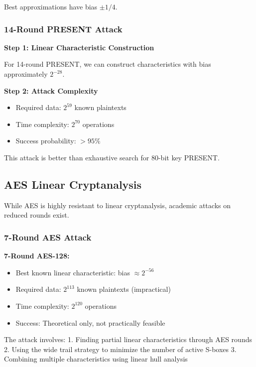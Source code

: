 \documentclass[12pt,a4paper]{article}
\begin{document}
Best approximations have bias $\pm 1/4$.

\subsubsection{14-Round PRESENT Attack}

\textbf{Step 1: Linear Characteristic Construction}

For 14-round PRESENT, we can construct characteristics with bias approximately $2^{-28}$.

\textbf{Step 2: Attack Complexity}
\begin{itemize}
    \item Required data: $2^{59}$ known plaintexts
    \item Time complexity: $2^{70}$ operations
    \item Success probability: $>95\%$
\end{itemize}

This attack is better than exhaustive search for 80-bit key PRESENT.

\subsection{AES Linear Cryptanalysis}

While AES is highly resistant to linear cryptanalysis, academic attacks on reduced rounds exist.

\subsubsection{7-Round AES Attack}

\begin{examplebox}[title=Reduced-Round AES Analysis]
\textbf{7-Round AES-128:}
\begin{itemize}
    \item Best known linear characteristic: bias $\approx 2^{-56}$
    \item Required data: $2^{113}$ known plaintexts (impractical)
    \item Time complexity: $2^{120}$ operations
    \item Success: Theoretical only, not practically feasible
\end{itemize}
\end{examplebox}

The attack involves:
1. Finding partial linear characteristics through AES rounds
2. Using the wide trail strategy to minimize the number of active S-boxes
3. Combining multiple characteristics using linear hull analysis
\end{document}
